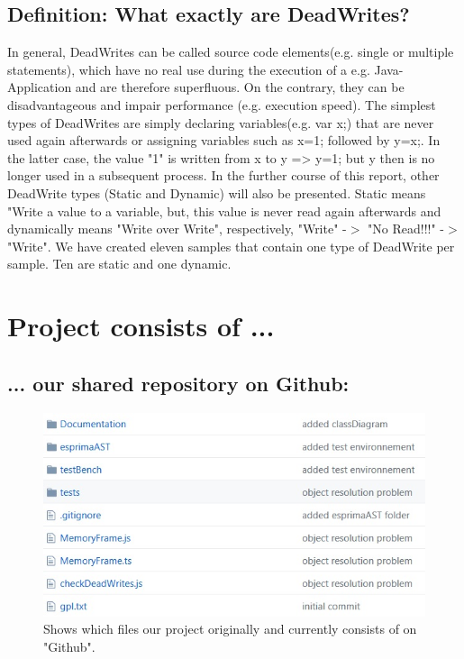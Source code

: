 \documentclass[a4paper]{scrartcl}
\begin{document}
\subsection{Definition: What exactly are DeadWrites?}
In general, DeadWrites can be called source code elements(e.g. single or multiple statements), which have no real use during the execution of a e.g. Java-Application and are therefore superfluous. On the contrary, they can be disadvantageous and impair performance (e.g. execution speed). The simplest types of DeadWrites are simply declaring variables(e.g. var x;) that are never used again afterwards or assigning variables such as x=1; followed by y=x;. In the latter case, the value "1" is written from x to y => y=1; but y then is no longer used in a subsequent process. In the further course of this report, other DeadWrite types (Static and Dynamic) will also be presented. Static means "Write a value to a variable, but, this value is never read again afterwards and dynamically means "Write over Write", respectively, "Write" -$>$ "No Read!!!"  -$>$ "Write".
We have created eleven samples that contain one type of DeadWrite per sample. Ten are static and one dynamic.
\newpage
\section{Project consists of ...}
\subsection{... our shared repository on Github:}
\begin{figure}[!htb]
	\centering
	\includegraphics[width=0.6\linewidth]{Github_Content.jpg}
	\caption{Shows which files our project originally and currently consists of on "Github".}
	\label{img:grafik-dummy}
\end{figure}
\end{document}
